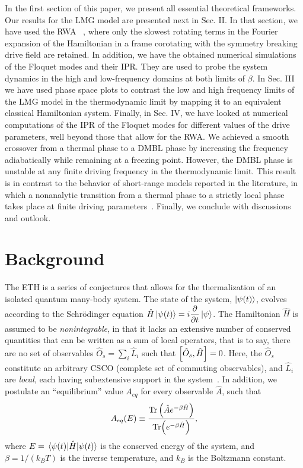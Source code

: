 \documentclass[%
reprint,
superscriptaddress,
amsmath,amssymb,
aps,
prb,
showkeys,
]{revtex4-2}
\begin{document}
In the first section of this paper, we present all essential theoretical frameworks. Our results for the LMG model are presented next in Sec. II. In that section, we have used the RWA ~\cite{fujii_introduction_2017}, where only the slowest rotating terms in the Fourier expansion of the Hamiltonian in a frame corotating with the symmetry breaking drive field are retained. In addition, we have the obtained {numerical simulations of} the Floquet modes and their IPR. They are used to probe the system dynamics in the high and low-frequency domains at both limits of $\beta$. In Sec. III we have used phase space plots to contrast the low and high frequency limits of the LMG model in the thermodynamic limit by mapping it to an equivalent classical Hamiltonian system. Finally, in Sec. IV, we have looked at numerical computations of the IPR of the Floquet modes for different values of the drive parameters, well beyond those that allow for the RWA. We achieved a smooth crossover from a thermal phase to a DMBL phase by increasing the frequency adiabatically while remaining at a freezing point. However, the DMBL phase is unstable at any finite driving frequency in the thermodynamic limit. This result is in contrast to the behavior of short-range models reported in the literature, in which a nonanalytic transition from a thermal phase to a strictly local phase takes place at finite driving parameters~\cite{asmi:floquet:thermalization}. Finally, we conclude with discussions and outlook.

\section{\label{sec:background} Background}

The ETH is a series of conjectures that allows for the thermalization of an isolated quantum many-body system. The state of the system, $\ket{\psi(t)}$, evolves according to the Schr\"odinger equation $\hat{H}\ket{\psi(t)} = i\displaystyle\frac{\partial}{\partial t}\ket{\psi}$. The Hamiltonian $\hat{H}$ is assumed to be \textit{nonintegrable}, in that  {it lacks an extensive number of conserved quantities that can be written as a sum of local operators, that is to say, there are no set of observables   $\hat{O}_s = \sum_i \hat{L}_i$ such that $\comm{\hat{O}_s}{\hat{H}}=0$. Here, the $\hat{O}_s$ constitute an arbitrary CSCO (complete set of commuting observables), and $\hat{L}_i$ are \textit{local}, each having subextensive support in the system}~\cite{Sutherland2004}. In addition, we postulate an ``equilibrium'' value $A_{eq}$ for every observable $\hat{A}$, such that
\begin{equation}
	\label{eq:aeq}
	A_{eq}(E)\equiv \frac{\Tr \left(\hat{A}e^{-\beta \hat{H}}\right)}{\Tr(e^{-\beta \hat{H}})},
\end{equation}
where $E=\expval{\hat{H}}{\psi(t)}$ is the conserved energy of the system, and $\beta = 1/(k_B T)$ is the inverse temperature, and $k_B$ is the Boltzmann constant.
\end{document}
